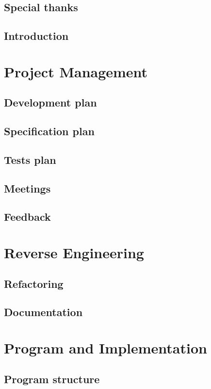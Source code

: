 \documentclass{rapport_log}
\begin{document}

\tableofcontents
	\chapter*{Special thanks}
		
	\chapter*{Introduction}
		
\part{Project Management}
	\chapter{Development plan}
		
	\chapter{Specification plan}
		
	\chapter{Tests plan}
		
	\chapter{Meetings}
		
	\chapter{Feedback}
		
\part{Reverse Engineering}
	\chapter{Refactoring}
			
	\chapter{Documentation}
		
\part{Program and Implementation}
        \chapter{Program structure}
                
\end{document}
